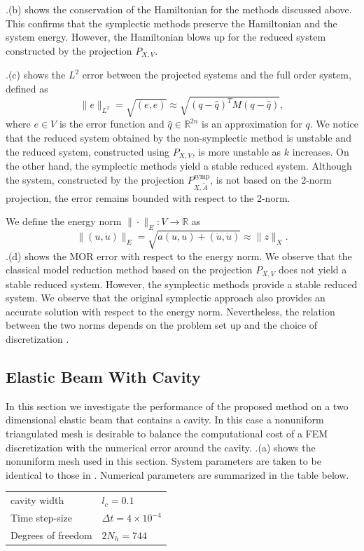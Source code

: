 .(b) shows the conservation of the Hamiltonian for the methods discussed above. This confirms that the symplectic methods preserve the Hamiltonian and the system energy. However, the Hamiltonian blows up for the reduced system constructed by the projection $P_{X,V}$.

.(c) shows the $L^2$ error between the projected systems and the full order system, defined as
\begin{equation}
	\| e \|_{L^2} = \sqrt{(e,e)} \approx \sqrt{ (q - \hat q)^T M (q-\hat q) },
\end{equation}
where $e\in V$ is the error function and $\hat q \in \mathbb R^{2n}$ is an approximation for $q$. We notice that the reduced system obtained by the non-symplectic method is unstable and the reduced system, constructed using $P_{X,V}$, is more unstable as $k$ increases. On the other hand, the symplectic methods yield a stable reduced system. Although the system, constructed by the projection $P^{\text{symp}}_{X,\tilde A}$, is not based on the 2-norm projection, the error remains bounded with respect to the 2-norm. 

We define the energy norm $\| \cdot \|_E : V \to \mathbb R$ as
\begin{equation}
	\| (u,\dot u) \|_E = \sqrt{ a(u,u) + (\dot u , \dot u) } \approx \| z \|_X.
\end{equation}
.(d) shows the MOR error with respect to the energy norm. We observe that the classical model reduction method based on the projection $P_{X,V}$ does not yield a stable reduced system. However, the symplectic methods provide a stable reduced system. We observe that the original symplectic approach also provides an accurate solution with respect to the energy norm. Nevertheless, the relation between the two norms depends on the problem set up and the choice of discretization \cite{DEPARIS20094359}.

\subsection{Elastic Beam With Cavity}  \label{sec:res.1.1}
In this section we investigate the performance of the proposed method on a two dimensional elastic beam that contains a cavity. In this case a nonuniform triangulated mesh is desirable to balance the computational cost of a FEM discretization with the numerical error around the cavity. .(a) shows the nonuniform mesh used in this section.
System parameters are taken to be identical to those in . Numerical parameters are summarized in the table below.
\vspace{0.5cm}
\begin{center}
\begin{tabular}{|l|l|}
\hline
cavity width & $l_c = 0.1$ \\
Time step-size & $\Delta t = 4\times 10^{-4}$ \\
Degrees of freedom & $2N_{h} = 744$ \\
\hline
\end{tabular}
\end{center}
\vspace{0.5cm}


